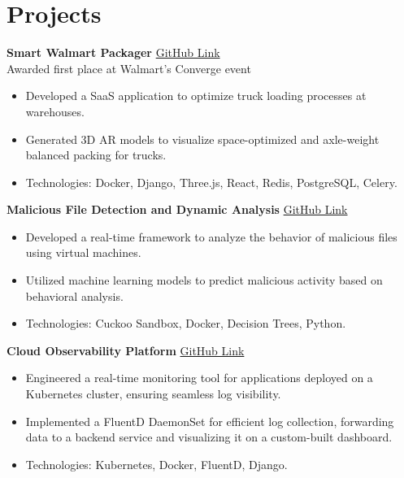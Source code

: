 \documentclass[a4paper,10pt]{article}
\begin{document}
\vspace{-1mm}

\section*{Projects}

\textbf{Smart Walmart Packager} \hfill \href{https://nalin-kumar-gupta.github.io/swp-demo/index.html}{GitHub Link} \\
Awarded first place at Walmart’s Converge event \\
\vspace{-5mm}
\begin{itemize}[noitemsep]
    \item Developed a SaaS application to optimize truck loading processes at warehouses.
    \item Generated 3D AR models to visualize space-optimized and axle-weight balanced packing for trucks.
    \item Technologies: Docker, Django, Three.js, React, Redis, PostgreSQL, Celery.
\end{itemize}

\vspace{-1mm}
\textbf{Malicious File Detection and Dynamic Analysis} \hfill \href{https://nalin-kumar-gupta.github.io/amd-demo/}{GitHub Link} \\
\vspace{-5mm}
\begin{itemize}[noitemsep]
    \item Developed a real-time framework to analyze the behavior of malicious files using virtual machines.
    \item Utilized machine learning models to predict malicious activity based on behavioral analysis.
    \item Technologies: Cuckoo Sandbox, Docker, Decision Trees, Python.
\end{itemize}

\vspace{-1mm}
\textbf{Cloud Observability Platform} \hfill \href{https://nalin-kumar-gupta.github.io/cop-demo/}{GitHub Link} \\
\vspace{-5mm}
\begin{itemize}[noitemsep]
    \item Engineered a real-time monitoring tool for applications deployed on a Kubernetes cluster, ensuring seamless log visibility.
    \item Implemented a FluentD DaemonSet for efficient log collection, forwarding data to a backend service and visualizing it on a custom-built dashboard.
    \item Technologies: Kubernetes, Docker, FluentD, Django.
\end{itemize}
\end{document}
